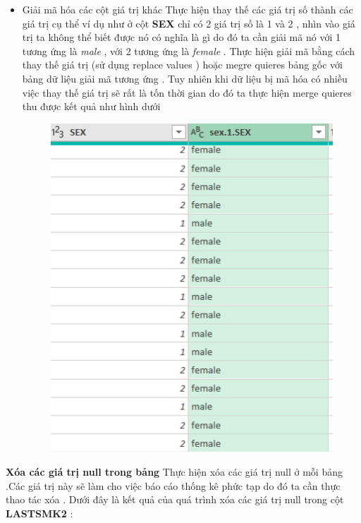 \begin{itemize}
\begin{figure}[!h]
\begin{center}
\end{center}
   \end{figure}
   \item Giải mã hóa các cột giá trị khác 
   Thực hiện thay thế các giá trị số thành các giá trị cụ thể ví dụ như ở cột \textbf{SEX} chỉ có 2 giá trị số là 1 và 2 , nhìn vào giá trị ta không thể biết được nó có nghĩa là gì do đó ta cần giải mã nó với 1 tương ứng là\textit{ male} , với 2 tương ứng là\textit{ female }.
   Thực hiện giải mã bằng cách thay thế giá trị (sử dụng replace values ) hoặc megre quieres bảng gốc với bảng dữ liệu giải mã tương ứng . Tuy nhiên khi dữ liệu bị mã hóa có nhiều việc thay thế giá trị sẽ rất là tốn thời gian do đó ta thực hiện merge quieres thu được kết quả như hình dưới
     \begin{figure}[!h]
                \begin{center}
                \includegraphics[scale = 0.8]{HONG/5.png}
                \end{center}
    \end{figure}
\end{itemize}
\textbf{Xóa các giá trị null trong bảng }
Thực hiện xóa các giá trị null ở mỗi bảng .Các giá trị này sẽ làm cho việc báo cáo thống kê phức  tạp do đó ta cần thực thao tác xóa . Dưới đây là kết quả của quá trình xóa các giá trị null trong cột \textbf{LASTSMK2} :
 
